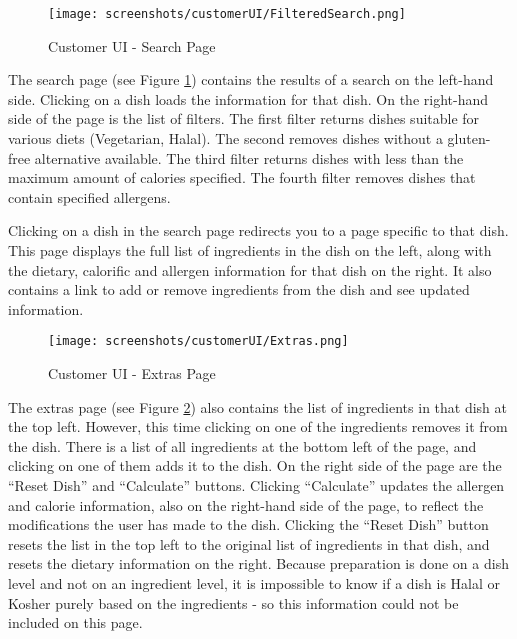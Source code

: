 \begin{figure}[h]
    \centering
    \captionsetup{justification=centering}
    \texttt{[image: screenshots/customerUI/FilteredSearch.png]}
    \caption{Customer UI - Search Page}
    \label{fig:customerUI_search}
\end{figure}

The search page (see Figure \ref{fig:customerUI_search}) contains the results of a search on the left-hand side. Clicking on a dish loads the information for that dish. On the right-hand side of the page is the list of filters. The first filter returns dishes suitable for various diets (Vegetarian, Halal). The second removes dishes without a gluten-free alternative available. The third filter returns dishes with less than the maximum amount of calories specified. The fourth filter removes dishes that contain specified allergens.

Clicking on a dish in the search page redirects you to a page specific to that dish. This page displays the full list of ingredients in the dish on the left, along with the dietary, calorific and allergen information for that dish on the right. It also contains a link to add or remove ingredients from the dish and see updated information.

\begin{figure}[h]
    \centering
    \captionsetup{justification=centering}
    \texttt{[image: screenshots/customerUI/Extras.png]}
    \caption{Customer UI - Extras Page}
    \label{fig:customerUI_extras}
\end{figure}

The extras page (see Figure \ref{fig:customerUI_extras}) also contains the list of ingredients in that dish at the top left. However, this time clicking on one of the ingredients removes it from the dish. There is a list of all ingredients at the bottom left of the page, and clicking on one of them adds it to the dish. On the right side of the page are the ``Reset Dish'' and ``Calculate'' buttons. Clicking ``Calculate'' updates the allergen and calorie information, also on the right-hand side of the page, to reflect the modifications the user has made to the dish. Clicking the ``Reset Dish'' button resets the list in the top left to the original list of ingredients in that dish, and resets the dietary information on the right. Because preparation is done on a dish level and not on an ingredient level, it is impossible to know if a dish is Halal or Kosher purely based on the ingredients - so this information could not be included on this page.

